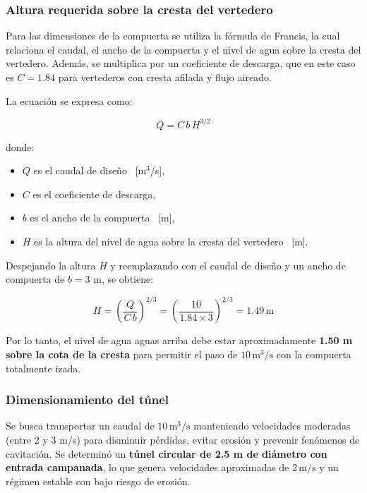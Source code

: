 \documentclass{article} %
\begin{document}
\subsubsection{Altura requerida sobre la cresta del vertedero}

Para las dimensiones de la compuerta se utiliza la fórmula de Francis, la cual relaciona el caudal, el ancho de la compuerta y el nivel de agua sobre la cresta del vertedero. Además, se multiplica por un coeficiente de descarga, que en este caso es $C = 1.84$ para vertederos con cresta afilada y flujo aireado.

La ecuación se expresa como:

\begin{equation}
    Q = C \, b \, H^{3/2}
\end{equation}

donde:
\begin{itemize}
    \item $Q$ es el caudal de diseño \, [m$^3$/s],
    \item $C$ es el coeficiente de descarga,
    \item $b$ es el ancho de la compuerta \, [m],
    \item $H$ es la altura del nivel de agua sobre la cresta del vertedero \, [m].
\end{itemize}

Despejando la altura $H$ y reemplazando con el caudal de diseño y un ancho de compuerta de $b = 3$ m, se obtiene:

\begin{equation}
    H = \left( \frac{Q}{C \, b} \right)^{2/3} = \left( \frac{10}{1.84 \times 3} \right)^{2/3} = 1.49 \, \text{m}
\end{equation}

Por lo tanto, el nivel de agua aguas arriba debe estar aproximadamente \textbf{1.50 m sobre la cota de la cresta} para permitir el paso de $10 \, \text{m}^3/\text{s}$ con la compuerta totalmente izada.

\subsubsection{Dimensionamiento del túnel}

Se busca transportar un caudal de $10 \, \text{m}^3/\text{s}$ manteniendo velocidades moderadas (entre 2 y 3 m/s) para disminuir pérdidas, evitar erosión y prevenir fenómenos de cavitación. Se determinó un \textbf{túnel circular de 2.5 m de diámetro con entrada campanada}, lo que genera velocidades aproximadas de $2 \, \text{m/s}$ y un régimen estable con bajo riesgo de erosión.
\end{document}
